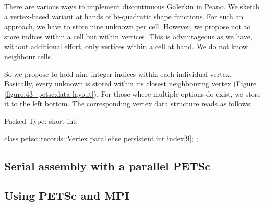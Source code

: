 There are various ways to implement discontinuous Galerkin in Peano. 
We sketch a vertex-based variant  at
hands of bi-quadratic shape functions.
For such an approach, we have to store nine unknown per cell.
However, we propose not to store indices within a cell but within vertices.
This is advantageous as we have, without additional effort, only vertices within
a cell at hand. 
We do not know neighbour cells.

So we propose to hold nine integer indices within each individual vertex.
Basically, every unknown is stored within its closest neighbouring vertex
(Figure \ref{figure:43_petsc:data-layout}). 
For those where multiple options do exist, we store it to the left bottom.
The corresponding vertex data structure reads as follows:
\begin{code}
Packed-Type: short int;

class petsc::records::Vertex {  
  parallelise persistent int index[9];
};
\end{code}




\subsection{Serial assembly with a parallel PETSc}


\subsection{Using PETSc and MPI}

